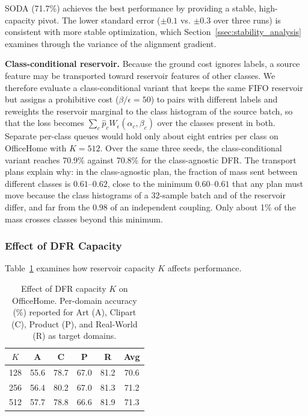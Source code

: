 SODA (71.7\%) achieves the best performance by providing a stable, high-capacity pivot. The lower standard error ($\pm 0.1$ vs. $\pm 0.3$ over three runs) is consistent with more stable optimization, which Section~\ref{ssec:stability_analysis} examines through the variance of the alignment gradient.

\textbf{Class-conditional reservoir.} Because the ground cost ignores labels, a source feature may be transported toward reservoir features of other classes. We therefore evaluate a class-conditional variant that keeps the same FIFO reservoir but assigns a prohibitive cost ($\beta/\epsilon=50$) to pairs with different labels and reweights the reservoir marginal to the class histogram of the source batch, so that the loss becomes $\sum_c \hat p_c W_\epsilon(\alpha_c,\beta_c)$ over the classes present in both. Separate per-class queues would hold only about eight entries per class on OfficeHome with $K=512$. Over the same three seeds, the class-conditional variant reaches 70.9\% against 70.8\% for the class-agnostic DFR. The transport plans explain why: in the class-agnostic plan, the fraction of mass sent between different classes is $0.61$--$0.62$, close to the minimum $0.60$--$0.61$ that any plan must move because the class histograms of a 32-sample batch and of the reservoir differ, and far from the $0.98$ of an independent coupling. Only about 1\% of the mass crosses classes beyond this minimum.

\subsubsection{Effect of DFR Capacity}

Table~\ref{tab:ablation_dfr_k} examines how reservoir capacity $K$ affects performance.

\begin{table}[t]
\caption{Effect of DFR capacity $K$ on OfficeHome. Per-domain accuracy (\%) reported for Art (A), Clipart (C), Product (P), and Real-World (R) as target domains.}
\label{tab:ablation_dfr_k}
\centering
\small
\renewcommand{\arraystretch}{1.1}
\begin{tabular}{ccccc|c}
\toprule
\textbf{$K$} & \textbf{A} & \textbf{C} & \textbf{P} & \textbf{R} & \textbf{Avg} \\
\midrule
128 & 55.6 & 78.7 & 67.0 & 81.2 & 70.6 \\
256 & 56.4 & 80.2 & 67.0 & 81.3 & 71.2 \\
512 & 57.7 & 78.8 & 66.6 & 81.9 & 71.3 \\
\bottomrule
\end{tabular}
\end{table}

